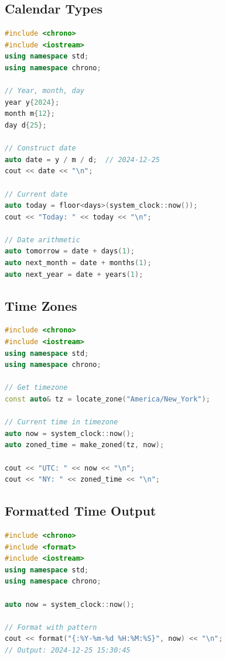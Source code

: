 \hypertarget{calendar-types}{%
\subsection{Calendar Types}\label{calendar-types}}

\begin{lstlisting}[language={C++}]
#include <chrono>
#include <iostream>
using namespace std;
using namespace chrono;

// Year, month, day
year y{2024};
month m{12};
day d{25};

// Construct date
auto date = y / m / d;  // 2024-12-25
cout << date << "\n";

// Current date
auto today = floor<days>(system_clock::now());
cout << "Today: " << today << "\n";

// Date arithmetic
auto tomorrow = date + days(1);
auto next_month = date + months(1);
auto next_year = date + years(1);
\end{lstlisting}

\hypertarget{time-zones}{%
\subsection{Time Zones}\label{time-zones}}

\begin{lstlisting}[language={C++}]
#include <chrono>
#include <iostream>
using namespace std;
using namespace chrono;

// Get timezone
const auto& tz = locate_zone("America/New_York");

// Current time in timezone
auto now = system_clock::now();
auto zoned_time = make_zoned(tz, now);

cout << "UTC: " << now << "\n";
cout << "NY: " << zoned_time << "\n";
\end{lstlisting}

\hypertarget{formatted-time-output}{%
\subsection{Formatted Time Output}\label{formatted-time-output}}

\begin{lstlisting}[language={C++}]
#include <chrono>
#include <format>
#include <iostream>
using namespace std;
using namespace chrono;

auto now = system_clock::now();

// Format with pattern
cout << format("{:%Y-%m-%d %H:%M:%S}", now) << "\n";
// Output: 2024-12-25 15:30:45
\end{lstlisting}

